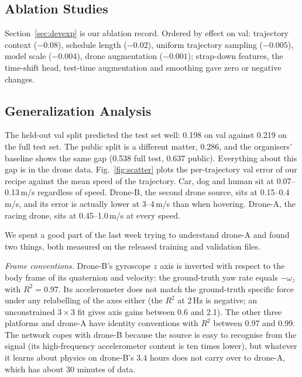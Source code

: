 \documentclass[letterpaper,10pt,conference]{ieeeconf}
\begin{document}
\subsection{Ablation Studies}
Section~\ref{sec:devexp} is our ablation record. Ordered by effect on val: trajectory context ($-0.08$), schedule
length ($-0.02$), uniform trajectory sampling ($-0.005$), model scale ($-0.004$), drone augmentation ($-0.001$);
strap-down features, the time-shift head, test-time augmentation and smoothing gave zero or negative changes.

\subsection{Generalization Analysis}
\label{sec:data}
The held-out val split predicted the test set well: 0.198 on val against 0.219 on the full test set. The public
split is a different matter, 0.286, and the organisers' baseline shows the same gap (0.538 full test, 0.637
public). Everything about this gap is in the drone data. Fig.~\ref{fig:scatter} plots the per-trajectory val error
of our recipe against the mean speed of the trajectory. Car, dog and human sit at 0.07--0.13\,m/s regardless of
speed. Drone-B, the second drone source, sits at 0.15--0.4\,m/s, and its error is actually lower at 3--4\,m/s than
when hovering. Drone-A, the racing drone, sits at 0.45--1.0\,m/s at every speed.

We spent a good part of the last week trying to understand drone-A and found two things, both measured on the
released training and validation files.

\emph{Frame conventions.} Drone-B's gyroscope $z$ axis is inverted with respect to the body frame of its quaternion
and velocity: the ground-truth yaw rate equals $-\omega_z$ with $R^2 = 0.97$. Its accelerometer does not match the
ground-truth specific force under any relabelling of the axes either (the $R^2$ at 2\,Hz is negative; an
unconstrained $3\times3$ fit gives axis gains between 0.6 and 2.1). The other three platforms and drone-A have
identity conventions with $R^2$ between 0.97 and 0.99. The network copes with drone-B because the source is easy to
recognise from the signal (its high-frequency accelerometer content is ten times lower), but whatever it learns about
physics on drone-B's 3.4 hours does not carry over to drone-A, which has about 30 minutes of data.
\end{document}
